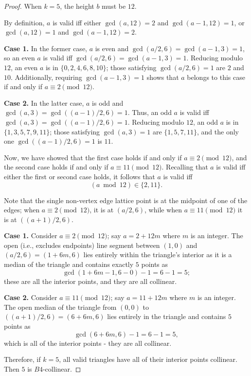 \documentclass[10pt,a4paper]{amsart}
\begin{document}
\begin{proof}
When $k=5$, the height $b$ must be $12$. 

By definition, $a$ is valid iff either $\gcd(a,12)=2$ and $\gcd(a-1,12)=1$, or $\gcd(a,12)=1$ and $\gcd(a-1,12)=2$. 

\textbf{Case 1.} In the former case, $a$ is even and $\gcd(a/2,6)=\gcd(a-1,3)=1$, so an even $a$ is valid iff $\gcd(a/2,6)=\gcd(a-1,3)=1$. Reducing modulo $12$, an even $a$ is in $\{0,2,4,6,8,10\}$; those satisfying $\gcd(a/2,6)=1$ are $2$ and $10$. Additionally, requiring $\gcd(a-1,3)=1$ shows that $a$ belongs to this case if and only if $a\equiv2\pmod{12}$. 

\textbf{Case 2.} In the latter case, $a$ is odd and $\gcd(a,3)=\gcd((a-1)/2,6)=1$. Thus, an odd $a$ is valid iff $\gcd(a,3)=\gcd((a-1)/2,6)=1$. Reducing modulo $12$, an odd $a$ is in $\{1,3,5,7,9,11\}$; those satisfying $\gcd(a,3)=1$ are $\{1,5,7,11\}$, and the only one $\gcd((a-1)/2,6)=1$ is $11$. 

Now, we have showed that the first case holds if and only if $a\equiv2\pmod{12}$, and the second case holds if and only if $a\equiv11\pmod{12}$. Recalling that $a$ is valid iff either the first or second case holds, it follows that $a$ is valid iff \[(a\bmod12)\in\{2,11\}.\] 

Note that the single non-vertex edge lattice point is at the midpoint of one of the edges; when $a\equiv2\pmod{12}$, it is at $(a/2,6)$, while when $a\equiv11\pmod{12}$ it is at $((a+1)/2,6)$. 

\textbf{Case 1.} Consider $a\equiv2\pmod{12}$; say $a=2+12m$ where $m$ is an integer. The open (i.e., excludes endpoints) line segment between $(1,0)$ and $(a/2,6)=(1+6m,6)$ lies entirely within the triangle's interior as it is a median of the triangle and contains exactly $5$ points as \[\gcd(1+6m-1,6-0)-1=6-1=5;\] these are all the interior points, and they are all collinear. 

\textbf{Case 2.} Consider $a\equiv11\pmod{12}$; say $a=11+12m$ where $m$ is an integer. The open median of the triangle from $(0,0)$ to $((a+1)/2,6)=(6+6m,6)$ lies entirely in the triangle and contains $5$ points as \[\gcd(6+6m,6)-1=6-1=5,\] which is all of the interior points - they are all collinear. 

Therefore, if $k=5$, all valid triangles have all of their interior points collinear. Then $5$ is $B4$-collinear. 
\end{proof}
\end{document}
